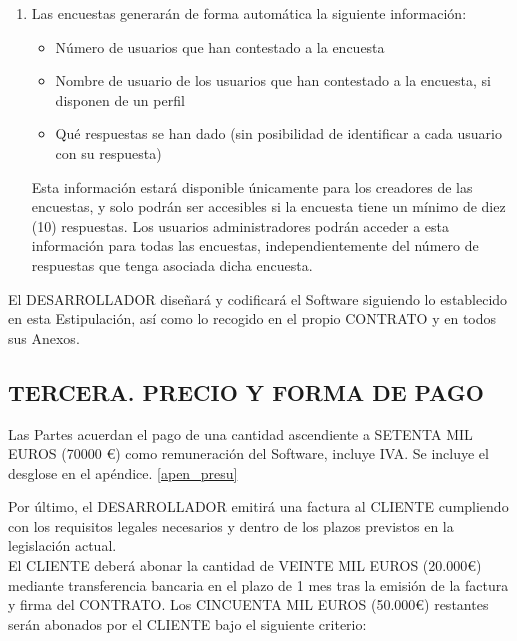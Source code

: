 \documentclass[a4paper,11pt]{report}
\begin{document}
\begin{enumerate}
		\item Las encuestas generarán de forma automática la siguiente información:
			\begin{itemize}
				\item Número de usuarios que han contestado a la encuesta
				\item Nombre de usuario de los usuarios que han contestado a la encuesta,
				si disponen de un perfil
				\item Qué respuestas se han dado (sin posibilidad de identificar
				a cada usuario con su respuesta)
			\end{itemize}
		Esta información estará disponible únicamente para los creadores de las
		encuestas, y solo podrán ser accesibles si la encuesta tiene un mínimo de
		diez (10) respuestas. Los usuarios administradores podrán acceder
		a esta información para todas las encuestas, independientemente del número
		de respuestas que tenga asociada dicha encuesta.
	\end{enumerate}

	El DESARROLLADOR diseñará y codificará el Software siguiendo lo
	establecido en esta Estipulación, así como lo recogido en el propio
	CONTRATO y en todos sus Anexos.

	\subsection*{TERCERA. PRECIO Y FORMA DE PAGO}

	Las Partes acuerdan el pago de una cantidad ascendiente a SETENTA MIL EUROS
	(70000 \euro) como remuneración del Software, incluye IVA.
	Se incluye el desglose en el apéndice. \ref{apen_presu}

	Por último, el DESARROLLADOR emitirá una factura al CLIENTE cumpliendo
	con los requisitos legales necesarios y dentro de los plazos previstos
	en la legislación actual. 
	\\
	El CLIENTE deberá abonar la cantidad de VEINTE MIL EUROS (20.000\euro)  mediante transferencia bancaria en el plazo de 1 mes tras la emisión de la factura y firma del CONTRATO. Los CINCUENTA MIL EUROS (50.000\euro)  restantes serán abonados por el CLIENTE bajo el siguiente criterio:
	
\end{document}

